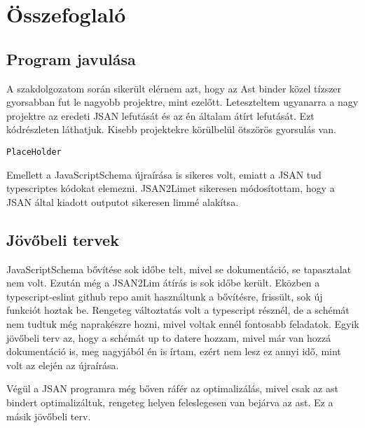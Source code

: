 \chapter{Összefoglaló}\label{chap:Összefoglaló}

\section{Program javulása}

\noindent

A szakdolgozatom során sikerült elérnem azt, hogy az Ast binder közel tízszer gyorsabban fut le nagyobb projektre, mint ezelőtt.
Leteszteltem ugyanarra a nagy projektre az eredeti JSAN lefutását és az én általam átírt lefutását. Ezt  kódrészleten láthatjuk.
Kisebb projektekre körülbelül ötszörös gyorsulás van.
\begin{lstlisting}[caption={JSAN lefutási idő előtte és utána}, label={lst:jsan_before_after_comparison}]
PlaceHolder
\end{lstlisting}

Emellett a JavaScriptSchema újraírása is sikeres volt, emiatt a JSAN tud typescriptes kódokat elemezni.
JSAN2Limet sikeresen módosítottam, hogy a JSAN által kiadott outputot sikeresen limmé alakítsa.
\section{Jövőbeli tervek}

\noindent

JavaScriptSchema bővítése sok időbe telt, mivel se dokumentáció, se tapasztalat nem volt. Ezután még a JSAN2Lim átírás is sok időbe került.
Eközben a typescript-eslint github repo amit használtunk a bővítésre, frissült, sok új funkciót hoztak be.
Rengeteg változtatás volt a typescript résznél, de a schémát nem tudtuk még naprakészre hozni, mivel voltak ennél fontosabb feladatok.
Egyik jövőbeli terv az, hogy a schémát up to datere hozzam, mivel már van hozzá dokumentáció is, meg nagyjából én is írtam, ezért nem lesz ez annyi idő, mint volt az elején az újraírása.

\noindent

Végül a JSAN programra még bőven ráfér az optimalizálás, mivel csak az ast bindert optimalizáltuk, rengeteg helyen feleslegesen van bejárva az ast.
Ez a másik jövőbeli terv.
